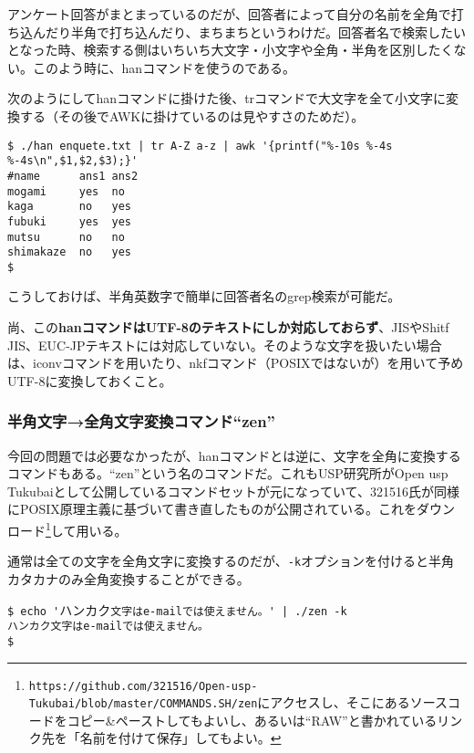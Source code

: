 アンケート回答がまとまっているのだが、回答者によって自分の名前を全角で打ち込んだり半角で打ち込んだり、まちまちというわけだ。回答者名で検索したいとなった時、検索する側はいちいち大文字・小文字や全角・半角を区別したくない。このよう時に、hanコマンドを使うのである。

次のようにしてhanコマンドに掛けた後、trコマンドで大文字を全て小文字に変換する（その後でAWKに掛けているのは見やすさのためだ）。
\begin{screen}
	\verb!$ ./han enquete.txt | tr A-Z a-z | awk '{printf("%-10s %-4s %-4s\n",$1,$2,$3);}'!\return \\
	\verb|#name      ans1 ans2| \\
	\verb|mogami     yes  no  | \\
	\verb|kaga       no   yes | \\
	\verb|fubuki     yes  yes | \\
	\verb|mutsu      no   no  | \\
	\verb|shimakaze  no   yes | \\
	\verb|$ |
\end{screen}

こうしておけば、半角英数字で簡単に回答者名のgrep検索が可能だ。

尚、この\textbf{hanコマンドはUTF-8のテキストにしか対応しておらず}、JISやShitf JIS、EUC-JPテキストには対応していない。そのような文字を扱いたい場合は、iconvコマンドを用いたり、nkfコマンド（POSIXではないが）を用いて予めUTF-8に変換しておくこと。

\subsubsection*{半角文字→全角文字変換コマンド``zen''}

今回の問題では必要なかったが、hanコマンドとは逆に、文字を全角に変換するコマンドもある。``zen''という名のコマンドだ。これもUSP研究所がOpen usp Tukubaiとして公開しているコマンドセットが元になっていて、321516氏が同様にPOSIX原理主義に基づいて書き直したものが公開されている。これをダウンロード\footnote{\verb|https://github.com/321516/Open-usp-Tukubai/blob/master/COMMANDS.SH/zen|にアクセスし、そこにあるソースコードをコピー\&{}ペーストしてもよいし、あるいは``RAW''と書かれているリンク先を「名前を付けて保存」してもよい。}して用いる。

通常は全ての文字を全角文字に変換するのだが、\verb|-k|オプションを付けると半角カタカナのみ全角変換することができる。
\begin{screen}
	\verb!$ echo '!$\!\!\!${\footnotesize ハ}$\!\!\!\!${\footnotesize ン}$\!\!\!\!${\footnotesize カ}$\!\!\!\!${\footnotesize ク}\verb!文字はe-mailでは使えません。' | ./zen -k!\return \\
	\verb|ハンカク文字はe-mailでは使えません。| \\
	\verb|$ |
\end{screen}

